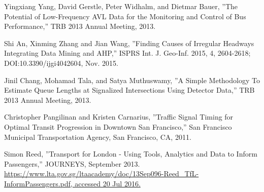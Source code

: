 \documentclass[12pt]{report}
\begin{document}
\begin{thebibliography}{14}
Yingxiang Yang, David Gerstle, Peter Widhalm, and Dietmar Bauer, ''The Potential of Low-Frequency AVL Data for the Monitoring and Control of Bus Performance,'' TRB 2013 Annual Meeting, 2013.

Shi An, Xinming Zhang and Jian Wang, ''Finding Causes of Irregular Headways Integrating Data Mining and AHP,'' ISPRS Int. J. Geo-Inf. 2015, 4, 2604-2618; DOI:10.3390/ijgi4042604, Nov. 2015.

Jinil Chang, Mohamad Tala, and Satya Muthuswamy, ''A Simple Methodology To Estimate Queue Lengths at Signalized Intersections Using Detector Data,'' TRB 2013 Annual Meeting, 2013.

Christopher Pangilinan and Kristen Carnarius, ''Traffic Signal Timing for Optimal Transit Progression in Downtown San Francisco,'' San Francisco Municipal Transportation Agency, San Francisco, CA, 2011.

Simon Reed, ''Transport for London - Using Tools, Analytics and Data to Inform Passengers,'' JOURNEYS, September 2013. \url{https://www.lta.gov.sg/ltaacademy/doc/13Sep096-Reed_TfL-InformPassengers.pdf, accessed 20 Jul 2016.}





\end{thebibliography}
\end{document}
